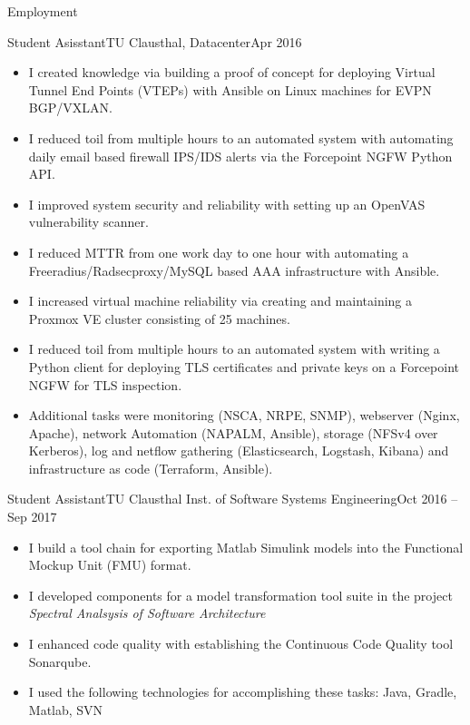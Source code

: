 \documentclass[]{mcdowellcv}
\begin{document}
\makeheader

\begin{cvsection}{Employment}
\begin{cvsubsection}{Student Asisstant}{TU Clausthal, Datacenter}{Apr 2016}

\begin{itemize}
\item I created knowledge via building a proof of concept for deploying Virtual Tunnel End Points (VTEPs) with Ansible on Linux machines for EVPN BGP/VXLAN.
\item I reduced toil from multiple hours to an automated system with automating daily email based firewall IPS/IDS alerts via the Forcepoint NGFW Python API.
\item I improved system security and reliability with setting up an OpenVAS vulnerability scanner.
\item I reduced MTTR from one work day to one hour with automating a Freeradius/Radsecproxy/MySQL based AAA infrastructure with Ansible.
\item I increased virtual machine reliability via creating and maintaining a Proxmox VE cluster consisting of 25 machines.
\item I reduced toil from multiple hours to an automated system with writing a Python client for deploying TLS certificates and private keys on a Forcepoint NGFW for TLS inspection.
\item Additional tasks were monitoring (NSCA, NRPE, SNMP), webserver (Nginx, Apache), network Automation (NAPALM, Ansible), storage (NFSv4 over Kerberos), log and netflow gathering (Elasticsearch, Logstash, Kibana) and infrastructure as code (Terraform, Ansible).
\end{itemize}
\end{cvsubsection}

\begin{cvsubsection}{Student Assistant}{TU Clausthal Inst. of Software Systems Engineering}{Oct 2016 -- Sep 2017}
\bigskip
\begin{itemize}
\item I build a tool chain for exporting Matlab Simulink models into the Functional Mockup Unit (FMU) format.
\item I developed components for a model transformation tool suite in the project \emph{Spectral Analsysis of Software Architecture}
\item I enhanced code quality with establishing the Continuous Code Quality tool Sonarqube.
\item I used the following technologies for accomplishing these tasks: Java, Gradle, Matlab, SVN
\end{itemize}
\end{cvsubsection}


\end{cvsection}
\end{document}
